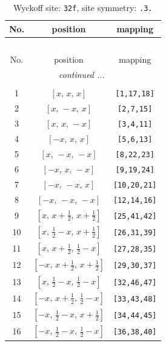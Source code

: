 \documentclass[fleqn,8pt]{jsarticle}
\begin{document}
\begin{longtable}{ccc}
\caption{Wyckoff site: {\tt 32f}, site symmetry: {\tt .3.}}
 \\
 \hline \hline
No. & position & mapping \\ \hline \endfirsthead

\multicolumn{2}{l}{\tablename\ \thetable{}} \\
 \hline \hline
No. & position & mapping \\ \hline \endhead

 \hline \hline
\multicolumn{2}{r}{\footnotesize\it continued ...} \\ \endfoot

 \hline \hline
\multicolumn{2}{r}{} \\ \endlastfoot

1 & $\left[ x,\, x,\, x \right]$ & {\tt [1,17,18]} \\ \hline
2 & $\left[ x,\, - x,\, x \right]$ & {\tt [2,7,15]} \\ \hline
3 & $\left[ x,\, x,\, - x \right]$ & {\tt [3,4,11]} \\ \hline
4 & $\left[ - x,\, x,\, x \right]$ & {\tt [5,6,13]} \\ \hline
5 & $\left[ x,\, - x,\, - x \right]$ & {\tt [8,22,23]} \\ \hline
6 & $\left[ - x,\, x,\, - x \right]$ & {\tt [9,19,24]} \\ \hline
7 & $\left[ - x,\, - x,\, x \right]$ & {\tt [10,20,21]} \\ \hline
8 & $\left[ - x,\, - x,\, - x \right]$ & {\tt [12,14,16]} \\ \hline
9 & $\left[ x,\, x + \frac{1}{2},\, x + \frac{1}{2} \right]$ & {\tt [25,41,42]} \\ \hline
10 & $\left[ x,\, \frac{1}{2} - x,\, x + \frac{1}{2} \right]$ & {\tt [26,31,39]} \\ \hline
11 & $\left[ x,\, x + \frac{1}{2},\, \frac{1}{2} - x \right]$ & {\tt [27,28,35]} \\ \hline
12 & $\left[ - x,\, x + \frac{1}{2},\, x + \frac{1}{2} \right]$ & {\tt [29,30,37]} \\ \hline
13 & $\left[ x,\, \frac{1}{2} - x,\, \frac{1}{2} - x \right]$ & {\tt [32,46,47]} \\ \hline
14 & $\left[ - x,\, x + \frac{1}{2},\, \frac{1}{2} - x \right]$ & {\tt [33,43,48]} \\ \hline
15 & $\left[ - x,\, \frac{1}{2} - x,\, x + \frac{1}{2} \right]$ & {\tt [34,44,45]} \\ \hline
16 & $\left[ - x,\, \frac{1}{2} - x,\, \frac{1}{2} - x \right]$ & {\tt [36,38,40]} \\ \hline

\end{longtable}
\end{document}
